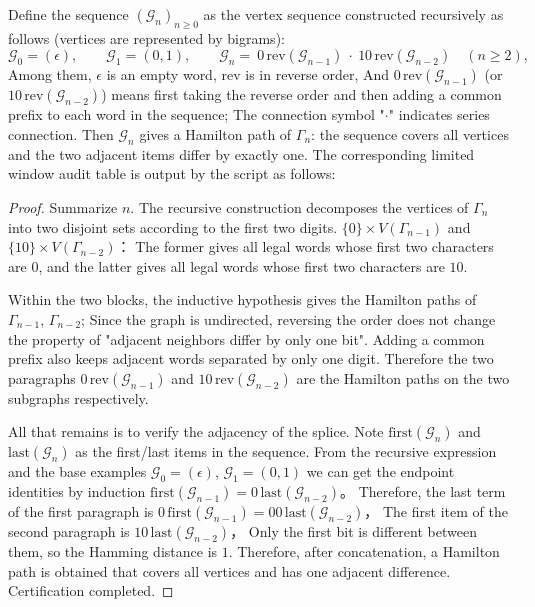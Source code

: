 \begin{theorem}\label{thm:pom-fibcube-gray-hamilton}
Define the sequence \((\mathcal G_n)_{n\ge 0}\) as the vertex sequence constructed recursively as follows (vertices are represented by bigrams):
\[
\mathcal G_0=(\epsilon),\qquad
\mathcal G_1=(0,1),\qquad
\mathcal G_n=\ 0\,\mathrm{rev}(\mathcal G_{n-1})\ \cdot\ 10\,\mathrm{rev}(\mathcal G_{n-2})\quad(n\ge 2),
\]
Among them, \(\epsilon\) is an empty word, \(\mathrm{rev}\) is in reverse order,
And \(0\,\mathrm{rev}(\mathcal G_{n-1})\) (or \(10\,\mathrm{rev}(\mathcal G_{n-2})\)) means first taking the reverse order and then adding a common prefix to each word in the sequence;
The connection symbol "\(\cdot\)" indicates series connection.
Then \(\mathcal G_n\) gives a Hamilton path of \(\Gamma_n\): the sequence covers all vertices and the two adjacent items differ by exactly one.
The corresponding limited window audit table is output by the script as follows:

\end{theorem}

\begin{proof}
Summarize \(n\). The recursive construction decomposes the vertices of \(\Gamma_n\) into two disjoint sets according to the first two digits.
\(
\{0\}\times V(\Gamma_{n-1})
\)
and
\(
\{10\}\times V(\Gamma_{n-2})
\)：
The former gives all legal words whose first two characters are \(0\), and the latter gives all legal words whose first two characters are \(10\).
\par
Within the two blocks, the inductive hypothesis gives the Hamilton paths of \(\Gamma_{n-1}\), \(\Gamma_{n-2}\);
Since the graph is undirected, reversing the order does not change the property of "adjacent neighbors differ by only one bit".
Adding a common prefix also keeps adjacent words separated by only one digit.
Therefore the two paragraphs
\(
0\,\mathrm{rev}(\mathcal G_{n-1})
\)
and
\(
10\,\mathrm{rev}(\mathcal G_{n-2})
\)
are the Hamilton paths on the two subgraphs respectively.
\par
All that remains is to verify the adjacency of the splice.
Note \(\mathrm{first}(\mathcal G_n)\) and \(\mathrm{last}(\mathcal G_n)\) as the first/last items in the sequence.
From the recursive expression and the base examples \(\mathcal G_0=(\epsilon)\), \(\mathcal G_1=(0,1)\) we can get the endpoint identities by induction
\(
\mathrm{first}(\mathcal G_{n-1})=0\,\mathrm{last}(\mathcal G_{n-2})
\)。
Therefore, the last term of the first paragraph is
\(
0\,\mathrm{first}(\mathcal G_{n-1})=00\,\mathrm{last}(\mathcal G_{n-2})
\)，
The first item of the second paragraph is
\(
10\,\mathrm{last}(\mathcal G_{n-2})
\)，
Only the first bit is different between them, so the Hamming distance is \(1\).
Therefore, after concatenation, a Hamilton path is obtained that covers all vertices and has one adjacent difference. Certification completed.
\end{proof}

